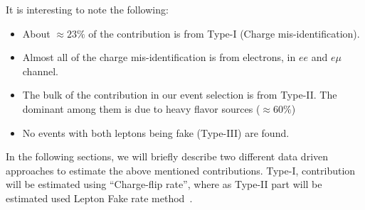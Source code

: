 It is interesting to note the following:
\begin{itemize}
\item About $\approx 23 \%$ of the contribution is from Type-I (Charge mis-identification).
\item Almost all of the charge mis-identification is from electrons, in $ee$ and $e\mu$ channel.
\item The bulk of the \ttbar contribution in our event selection is from Type-II. The dominant among them 
is due to heavy flavor sources ($\approx 60 \%$)
\item No events with both leptons being fake (Type-III) are found.
\end{itemize} 

In the following sections, we will briefly describe two different data driven approaches to 
estimate the above mentioned contributions. Type-I, contribution will be estimated using ``Charge-flip rate'', 
where as Type-II part will be estimated used Lepton Fake rate method~\cite{fakelep}.



